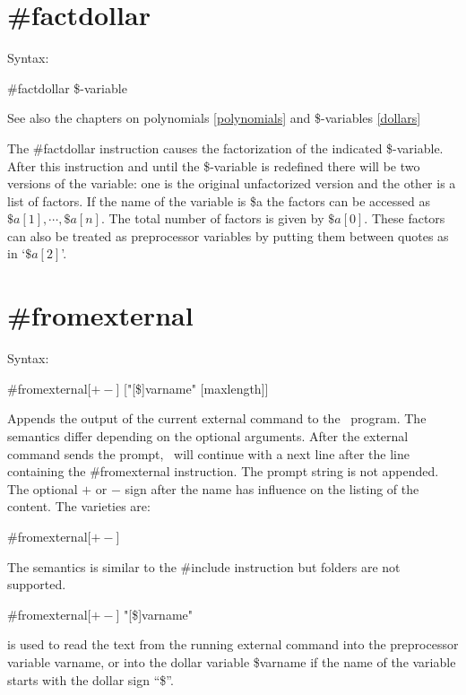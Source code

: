 
\section{\#factdollar}
\label{prefactdollar}

\noindent Syntax:

\#factdollar \$-variable
 
\noindent See also the chapters on polynomials \ref{polynomials} and 
\$-variables \ref{dollars}

\noindent The \#factdollar instruction causes the 
factorization of the indicated \$-variable. After this instruction and 
until the \$-variable is redefined there will be two versions of the 
variable: one is the original unfactorized version and the other is a list 
of factors. If the name of the variable is \$a the factors can be accessed 
as $\$a[1],\cdots,\$a[n]$. The total number of factors is given by 
$\$a[0]$. These factors can also be treated as preprocessor variables by 
putting them between quotes as in `$\$a[2]$'.


\section{\#fromexternal}
\label{prefromexternal}

\noindent Syntax:

\#fromexternal[$+-$] ["[\$]varname" [maxlength]]

\noindent Appends the output of the current external 
command to the \FORM\ program. The semantics differ depending on the optional 
arguments. After the external command sends the prompt, \FORM\ 
will continue with a next line after the line containing the \#fromexternal 
instruction. The prompt string is not appended. The optional $+$ or $-$ sign 
after the name has influence on the listing of the content. The varieties 
are:
                                                           
\#fromexternal[$+-$]

\noindent The semantics is similar to the \#include 
instruction but folders are not supported. 

\#fromexternal[$+-$] "[\$]varname"

\noindent is used to read the text from the running external command into 
the preprocessor variable varname, or into the dollar variable \$varname if 
the name of the variable starts with the dollar sign ``\$''.

